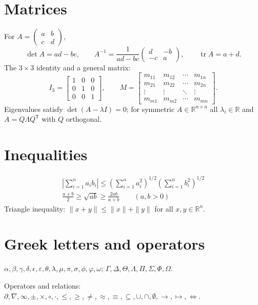 \documentclass[11pt]{article}
\newcommand{\R}{\mathbb{R}}
\DeclareMathOperator{\tr}{tr}
\begin{document}
\section*{Matrices}
For $A = \begin{pmatrix} a & b \\ c & d \end{pmatrix}$,
\[
  \det A = ad - bc, \qquad
  A^{-1} = \frac{1}{ad - bc} \begin{pmatrix} d & -b \\ -c & a \end{pmatrix}, \qquad
  \tr A = a + d .
\]
The $3\times3$ identity and a general matrix:
\[
  I_3 = \begin{bmatrix} 1 & 0 & 0 \\ 0 & 1 & 0 \\ 0 & 0 & 1 \end{bmatrix}, \qquad
  M = \begin{bmatrix}
    m_{11} & m_{12} & \cdots & m_{1n} \\
    m_{21} & m_{22} & \cdots & m_{2n} \\
    \vdots & \vdots & \ddots & \vdots \\
    m_{m1} & m_{m2} & \cdots & m_{mn}
  \end{bmatrix}.
\]
Eigenvalues satisfy $\det(A - \lambda I) = 0$; for symmetric $A \in \R^{n\times n}$
all $\lambda_i \in \R$ and $A = Q \Lambda Q^{\mathsf{T}}$ with $Q$ orthogonal.

\section*{Inequalities}
\begin{gather}
  \left| \sum_{i=1}^{n} a_i b_i \right| \le \left( \sum_{i=1}^{n} a_i^2 \right)^{1/2}
  \left( \sum_{i=1}^{n} b_i^2 \right)^{1/2} \\
  \frac{a+b}{2} \ge \sqrt{ab} \ge \frac{2ab}{a+b} \qquad (a, b > 0)
\end{gather}
Triangle inequality: $\|x + y\| \le \|x\| + \|y\|$ for all $x, y \in \R^n$.

\section*{Greek letters and operators}
$\alpha, \beta, \gamma, \delta, \epsilon, \varepsilon, \theta, \lambda, \mu,
\pi, \sigma, \phi, \varphi, \omega$; \quad
$\Gamma, \Delta, \Theta, \Lambda, \Pi, \Sigma, \Phi, \Omega$.

Operators and relations:
$\partial, \nabla, \infty, \pm, \times, \circ, \cdot, \le, \ge, \ne, \approx, \equiv,
\subseteq, \cup, \cap, \emptyset, \to, \mapsto, \Leftrightarrow$.
\end{document}
